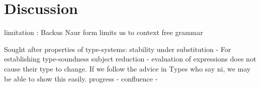 \chapter{Discussion}

limitation : Backus Naur form limits us to context free grammar

Sought after properties of type-systems:
stability under substitution -
For establishing type-soundness
subject reduction - evaluation of expressions does not cause their
type to change. If we follow the advice in \cite{TypesWhoSayNi} Types
who say ni, we may be able to show this easily.
progress -
confluence - 
